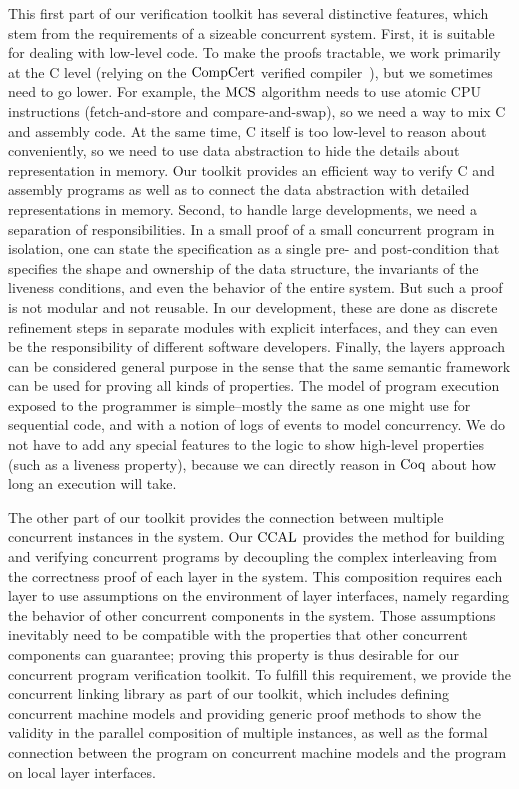 This first part of our verification toolkit has several distinctive features, which stem from the requirements of a sizeable concurrent system. 
First, it is suitable for dealing with low-level code.
To make the proofs tractable, we work primarily at the C level (relying on the $\mathrm{CompCert}$ verified compiler~\cite{compcert}), 
but we sometimes need to go lower. For example, the $\mathrm{MCS}$ algorithm needs to use atomic CPU instructions (fetch-and-store and compare-and-swap), 
so we need a way to mix C and assembly code. 
At the same time, C itself is too low-level to reason about conveniently, 
so we need to use data abstraction to hide the details about representation in memory. 
Our toolkit provides an efficient way to verify C and assembly programs as well as to connect the data abstraction with detailed representations in memory. 
Second, to handle large developments, we need a separation of responsibilities. 
In a small proof of a small concurrent program in isolation, one can state the specification as a single pre- and post-condition that specifies the shape and ownership of the data structure, 
the invariants of the liveness conditions, and even the behavior of the entire system. 
But such a proof is not modular and not reusable. 
In our development, these are done as discrete refinement steps in separate modules with explicit interfaces, and they can even be the responsibility of different software developers. 
Finally, the layers approach can be considered general purpose in the sense that the same semantic framework can be used for proving all kinds of properties. 
The model of program execution exposed to the programmer is simple--mostly the same as one might use for sequential code, and with a notion of logs of events to model concurrency. 
We do not have to add any special features to the logic to show high-level properties (such as a liveness property), because we can directly reason in $\mathrm{Coq}$ about how long an execution will take. 
 
The other part of our toolkit provides the connection between multiple concurrent instances in the system. 
Our $\mathrm{CCAL}$ provides the method for building and verifying concurrent programs by decoupling the complex interleaving from the correctness proof of each layer in the system. 
This composition requires each layer to use assumptions on the environment of  layer interfaces, 
namely regarding the behavior of other concurrent components in the system. 
Those assumptions inevitably need to be compatible with the properties that other concurrent components can guarantee; 
proving this property is thus desirable for our concurrent program verification toolkit. 
To fulfill this requirement, we provide the concurrent linking library as part of our toolkit, 
which includes defining concurrent machine models and providing generic proof methods to show the validity in the parallel composition of multiple instances, 
as well as the formal connection between the program on concurrent machine models and the program on  local layer interfaces. 

